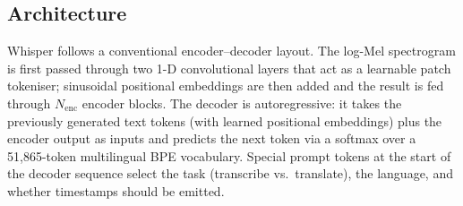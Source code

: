 \documentclass[12pt,a4paper]{report}
\begin{document}
\subsection{Architecture}

Whisper follows a conventional encoder--decoder layout. The
log-Mel spectrogram is first passed through two 1-D convolutional layers
that act as a learnable patch tokeniser; sinusoidal positional embeddings
are then added and the result is fed through $N_{\mathrm{enc}}$ encoder
blocks. The decoder is autoregressive: it takes the previously generated
text tokens (with learned positional embeddings) plus the encoder output as
inputs and predicts the next token via a softmax over a 51{,}865-token
multilingual BPE vocabulary. Special prompt tokens at the start of the
decoder sequence select the task (transcribe vs.\ translate), the language,
and whether timestamps should be emitted.
\end{document}
